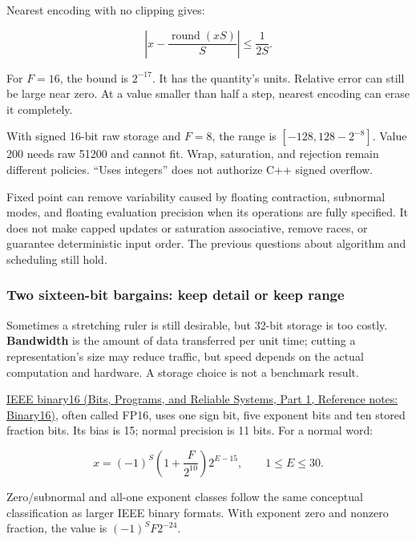 \hypertarget{05-engine-i-ch001-a-constant-grid-changes-error-not-the-existence-of-error}{}

Nearest encoding with no clipping gives:

\[
\left|x-\frac{\operatorname{round}(xS)}{S}\right|\le\frac{1}{2S}.
\]

For \(F=16\), the bound is \(2^{-17}\). It has the quantity's units. Relative error can still be large near zero. At a value smaller than half a step, nearest encoding can erase it completely.

With signed 16-bit raw storage and \(F=8\), the range is \([-128,128-2^{-8}]\). Value 200 needs raw 51200 and cannot fit. Wrap, saturation, and rejection remain different policies. ``Uses integers'' does not authorize C++ signed overflow.

Fixed point can remove variability caused by floating contraction, subnormal modes, and floating evaluation precision when its operations are fully specified. It does not make capped updates or saturation associative, remove races, or guarantee deterministic input order. The previous questions about algorithm and scheduling still hold.

\subsubsection{Two sixteen-bit bargains: keep detail or keep range}\label{05-engine-i-ch001-two-sixteen-bit-bargains-keep-detail-or-keep-range}

\hypertarget{05-engine-i-ch001-two-sixteen-bit-bargains-keep-detail-or-keep-range}{}

Sometimes a stretching ruler is still desirable, but 32-bit storage is too costly. \textbf{Bandwidth} is the amount of data transferred per unit time; cutting a representation's size may reduce traffic, but speed depends on the actual computation and hardware. A storage choice is not a benchmark result.

\href{../01-Bits-Programs-and-Reliable-Systems-P01/main.pdf\#nameddest=appendix-34443cec7170}{IEEE binary16 (Bits, Programs, and Reliable Systems, Part 1, Reference notes: Binary16)}, often called FP16, uses one sign bit, five exponent bits and ten stored fraction bits. Its bias is 15; normal precision is 11 bits. For a normal word:

\[
x=(-1)^S\left(1+\frac{F}{2^{10}}\right)2^{E-15},
\qquad 1\le E\le30.
\]

Zero/subnormal and all-one exponent classes follow the same conceptual classification as larger IEEE binary formats. With exponent zero and nonzero fraction, the value is \((-1)^SF2^{-24}\).

